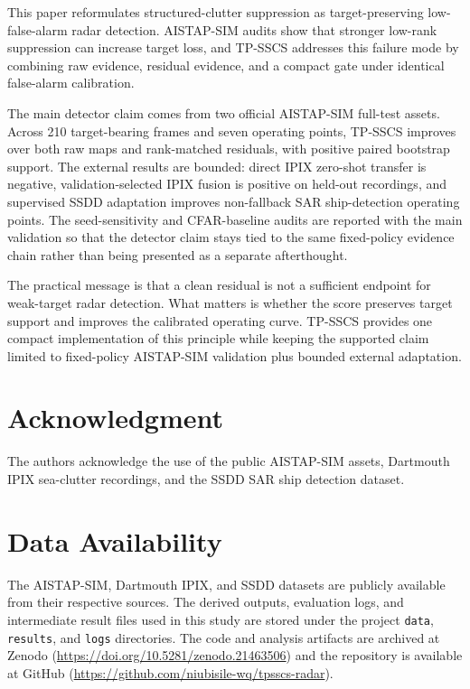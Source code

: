 \documentclass[journal]{IEEEtran}
\begin{document}
This paper reformulates structured-clutter suppression as target-preserving low-false-alarm radar detection. AISTAP-SIM audits show that stronger low-rank suppression can increase target loss, and TP-SSCS addresses this failure mode by combining raw evidence, residual evidence, and a compact gate under identical false-alarm calibration.

The main detector claim comes from two official AISTAP-SIM full-test assets. Across 210 target-bearing frames and seven operating points, TP-SSCS improves over both raw maps and rank-matched residuals, with positive paired bootstrap support. The external results are bounded: direct IPIX zero-shot transfer is negative, validation-selected IPIX fusion is positive on held-out recordings, and supervised SSDD adaptation improves non-fallback SAR ship-detection operating points. The seed-sensitivity and CFAR-baseline audits are reported with the main validation so that the detector claim stays tied to the same fixed-policy evidence chain rather than being presented as a separate afterthought.

The practical message is that a clean residual is not a sufficient endpoint for weak-target radar detection. What matters is whether the score preserves target support and improves the calibrated operating curve. TP-SSCS provides one compact implementation of this principle while keeping the supported claim limited to fixed-policy AISTAP-SIM validation plus bounded external adaptation.

\section*{Acknowledgment}

The authors acknowledge the use of the public AISTAP-SIM assets, Dartmouth IPIX sea-clutter recordings, and the SSDD SAR ship detection dataset.

\section*{Data Availability}

The AISTAP-SIM, Dartmouth IPIX, and SSDD datasets are publicly available from their respective sources. The derived outputs, evaluation logs, and intermediate result files used in this study are stored under the project \texttt{data}, \texttt{results}, and \texttt{logs} directories. The code and analysis artifacts are archived at Zenodo (\url{https://doi.org/10.5281/zenodo.21463506}) and the repository is available at GitHub (\url{https://github.com/niubisile-wq/tpsscs-radar}).
\end{document}
